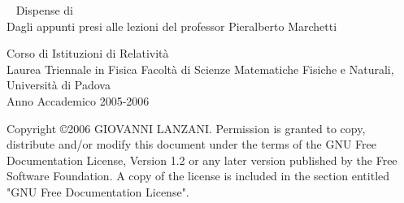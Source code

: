 \begin{titlepage}
\begin{center}
\mbox{} \vskip 2cm
\ \Huge \hskip 0.5cm Dispense di \\
\vskip 2cm
\normalsize Dagli appunti presi alle lezioni del professor Pieralberto Marchetti\\
\vskip 3cm

Corso di Istituzioni di Relativit\`a \\
Laurea Triennale in Fisica \newline
Facolt\`a di Scienze Matematiche Fisiche e Naturali, Universit\`a di Padova \\
Anno Accademico 2005-2006\\
\vspace{1cm}


\end{center}
\end{titlepage}


Copyright \copyright  2006 GIOVANNI LANZANI. \newline
      Permission is granted to copy, distribute and/or modify this
      document \newline
      under the terms of the GNU Free Documentation License, Version 1.2 \newline
      or any later version published by the Free Software Foundation. \newline
      A copy of the license is included in the section entitled "GNU \newline
      Free Documentation License". \newline
